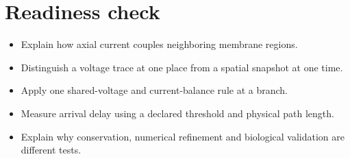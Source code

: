 \documentclass[11pt,letterpaper]{article}
\theoremstyle{definition}\newtheorem{definition}{Definition}\newtheorem{example}{Example}
\numberwithin{equation}{section}
\begin{document}
\section*{Readiness check}
\begin{itemize}
\item Explain how axial current couples neighboring membrane regions.
\item Distinguish a voltage trace at one place from a spatial snapshot at one time.
\item Apply one shared-voltage and current-balance rule at a branch.
\item Measure arrival delay using a declared threshold and physical path length.
\item Explain why conservation, numerical refinement and biological validation are different tests.
\end{itemize}
\end{document}
